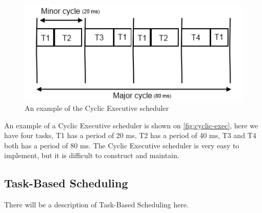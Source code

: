 \begin{figure}[hbtp]
\center
\includegraphics[width=\textwidth]{img/cyclic-exec.png}
\caption{An example of the Cyclic Executive scheduler} 
\label{fig:cyclic-exec} 
\end{figure}

An example of a Cyclic Executive scheduler is shown on \autoref{fig:cyclic-exec}, here we have four tasks, T1 has a period of 20 ms, T2 has a period of 40 ms, T3 and T4 both has a period of 80 ms.
The Cyclic Executive scheduler is very easy to implement, but it is difficult to construct and maintain.

\subsection{Task-Based Scheduling}
There will be a description of Task-Based Scheduling here.
